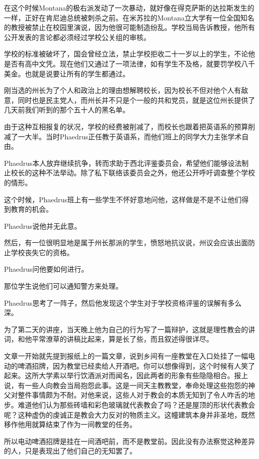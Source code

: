 \documentclass[UTF8]{article}
\begin{document}
\par 在这个时候Montana的极右派发动了一次暴动，就好像在得克萨斯的达拉斯发生的一样，正好在肯尼迪总统被刺杀之前。在米苏拉的Montana立大学有一位全国知名的教授被禁止在校园里演说，因为他很可能制造纷乱。学校当局告诉教授，他所有公开发表的言论都必须经过学校公关组的审核。
\par 学校的标准被破坏了，国会曾经立法，禁止学校拒收二十一岁以上的学生，不论他是否有高中文凭。现在他们又通过了一项法律，如有学生不及格，就要罚学校八千美金。也就是说要让所有的学生都通过。
\par 刚当选的州长为了个人和政治上的理由想解聘校长，因为校长不但对他个人有敌意，同时也是民主党人，而州长并不只是个一般的共和党员，就是这位州长提供了几天前我们听到的那个五十人的黑名单。
\par 由于这种互相报复的状况，学校的经费被削减了，而校长也跟着把英语系的预算削减了一大半。当时Phaedrus正任教于英语系，而他们班上的同学大力主张学术自由。
\par Phaedrus本人放弃继续抗争，转而求助于西北评鉴委员会，希望他们能够设法制止校长的这种不法举动。除了私下联络该委员会之外，他还公开呼吁调查整个学校的情形。
\par 这个时候，Phaedrus班上有一些学生不怀好意地问他，这样做是不是不让他们得到教育的机会。
\par Phaedrus说他并无此意。
\par 然后，有一位很明显地是属于州长那派的学生，愤怒地抗议说，州议会应该出面防止学校丧失它的资格。
\par Phaedrus问他要如何进行。
\par 那位学生说他们可以通知警方来处理。
\par Phaedrus思考了一阵子，然后他发现这个学生对于学校资格评鉴的误解有多么深。
\par 为了第二天的讲座，当天晚上他为自己的行为写了一篇辩护，这就是理性教会的讲词，和他平常潦草的讲稿比起来，算是长了些，而且叙述得很详尽。
\par 文章一开始就先提到报纸上的一篇文章，说到乡间有一座教堂在入口处挂了一幅电动的啤酒招牌，因为教堂已经卖给人开酒吧。你可以想像得到，这个时候有人笑了起来。这所大学素以举行饮酒派对而闻名，因此两者的形象有些隐隐相合。报上说，有一些人向教会当局抱怨此事。这是一间天主教教堂，奉命处理这些抱怨的神父对整件事情颇为不耐。对他来说，这些人对于教会的本质无知到了令人咋舌的地步。难道他们认为那些砖墙和彩色玻璃就代表教会了吗？还是屋顶的形状代表教会呢？这种虚伪的虔诚正是教会大力反对的物质主义。这幢建筑本身并非圣地，既然移作他用就算结束了作为一间教堂的任务。
\par 所以电动啤酒招牌是挂在一间酒吧前，而不是教堂前。因此没有办法察觉这种差异的人，只是表现出了他们自己的无知罢了。
\end{document}
